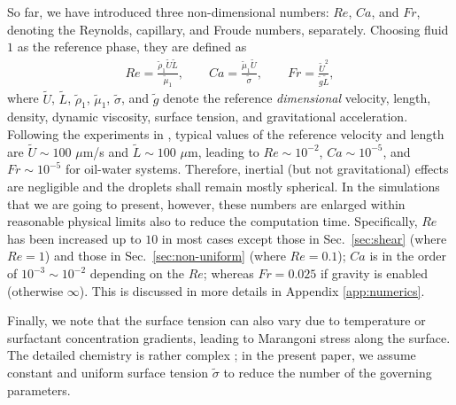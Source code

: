 So far, we have introduced three non-dimensional numbers: $Re$, $Ca$, and $Fr$, denoting the Reynolds, capillary, and Froude numbers, separately. Choosing fluid $1$ as the reference phase, they are defined as
\begin{equation}
  \begin{aligned}
    Re = \frac{\tilde{\rho}_1 \tilde{U} \tilde{L}}{\tilde{\mu}_1},\quad \quad Ca = \frac{\tilde{\mu}_1 \tilde{U}}{\tilde{\sigma}},\quad \quad Fr=\frac{\tilde{U}^2}{\tilde{g}\tilde{L}},      
  \label{non-di}    
  \end{aligned}
\end{equation}
where $\tilde{U}$, $\tilde{L}$, $\tilde{\rho}_1$, $\tilde{\mu}_1$, $\tilde{\sigma}$, and $\tilde{g}$ denote the reference \textit{dimensional} velocity, length, density, dynamic viscosity, surface tension, and gravitational acceleration. Following the experiments in   \cite{Shen_2016AS}, typical values of the reference velocity and length are $\tilde{U} \sim 100$ $\mu$m/s and $\tilde{L} \sim 100$ $\mu$m, leading to $Re \sim 10^{-2}$, $Ca \sim 10^{-5}$, and $Fr \sim 10^{-5}$ for oil-water systems. Therefore, inertial (but not gravitational) effects are negligible and the droplets shall remain mostly spherical. In the simulations that we are going to present, however, these numbers are enlarged within reasonable physical limits also to reduce the computation time. Specifically, $Re$ has been increased up to $10$ in most cases except those in Sec.\ \ref{sec:shear} (where $Re=1$) and those in Sec.\ \ref{sec:non-uniform} (where $Re=0.1$); $Ca$ is in the order of $10^{-3} \sim 10^{-2}$ depending on the $Re$; whereas $Fr=0.025$ if gravity is enabled (otherwise $\infty$).  This is discussed in more details in Appendix \ref{app:numerics}. 

Finally, we note that the surface tension can also vary due to temperature or surfactant concentration gradients, leading to Marangoni stress along the surface. The detailed chemistry is rather complex \cite{Eastoe}; in the present paper, we assume constant and uniform surface tension $\tilde{\sigma}$ to reduce the number of the governing parameters.


